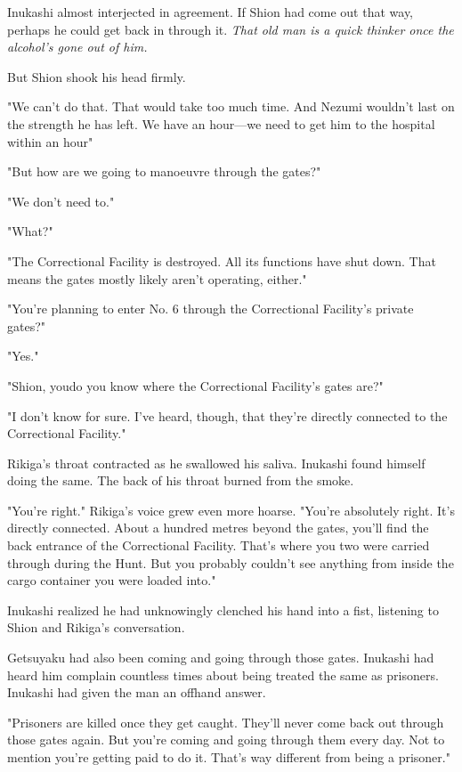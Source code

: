 Inukashi almost interjected in agreement. If Shion had come out that
way, perhaps he could get back in through it. \emph{That old man is a quick
thinker once the alcohol's gone out of him.}

But Shion shook his head firmly.

"We can't do that. That would take too much time. And Nezumi wouldn't
last on the strength he has left. We have an hour---we need to get him to
the hospital within an hour\el "

"But how are we going to manoeuvre through the gates?"

"We don't need to."

"What?"

"The Correctional Facility is destroyed. All its functions have shut
down. That means the gates mostly likely aren't operating, either."

"You're planning to enter No. 6 through the Correctional Facility's
private gates?"

"Yes."

"Shion, you\el do you know where the Correctional Facility's gates are?"

"I don't know for sure. I've heard, though, that they're directly
connected to the Correctional Facility."

Rikiga's throat contracted as he swallowed his saliva. Inukashi found
himself doing the same. The back of his throat burned from the smoke.

"You're right." Rikiga's voice grew even more hoarse. "You're absolutely
right. It's directly connected. About a hundred metres beyond the gates,
you'll find the back entrance of the Correctional Facility. That's where
you two were carried through during the Hunt. But you probably couldn't
see anything from inside the cargo container you were loaded into."

Inukashi realized he had unknowingly clenched his hand into a fist,
listening to Shion and Rikiga's conversation.

Getsuyaku had also been coming and going through those gates. Inukashi
had heard him complain countless times about being treated the same as
prisoners. Inukashi had given the man an offhand answer.

"Prisoners are killed once they get caught. They'll never come back out
through those gates again. But you're coming and going through them
every day. Not to mention you're getting paid to do it. That's way
different from being a prisoner."

